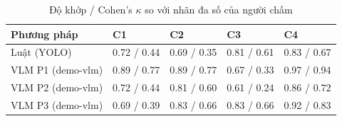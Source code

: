\begin{table}[t]
\centering
\caption{Độ khớp / Cohen's $\kappa$ so với nhãn đa số của người chấm}
\footnotesize
\begin{tabular}{lllll}
\hline
Phương pháp & C1 & C2 & C3 & C4 \\
\hline
Luật (YOLO) & 0.72 / 0.44 & 0.69 / 0.35 & 0.81 / 0.61 & 0.83 / 0.67 \\
VLM P1 (demo-vlm) & 0.89 / 0.77 & 0.89 / 0.77 & 0.67 / 0.33 & 0.97 / 0.94 \\
VLM P2 (demo-vlm) & 0.72 / 0.44 & 0.81 / 0.60 & 0.61 / 0.24 & 0.86 / 0.72 \\
VLM P3 (demo-vlm) & 0.69 / 0.39 & 0.83 / 0.66 & 0.83 / 0.66 & 0.92 / 0.83 \\
\hline
\end{tabular}
\end{table}